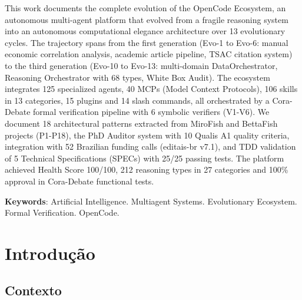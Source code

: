 \documentclass[12pt,a4paper,sumario=tradicional]{abntex2}
\begin{document}
This work documents the complete evolution of the OpenCode Ecosystem, an autonomous multi-agent platform that evolved from a fragile reasoning system into an autonomous computational elegance architecture over 13 evolutionary cycles. The trajectory spans from the first generation (Evo-1 to Evo-6: manual economic correlation analysis, academic article pipeline, TSAC citation system) to the third generation (Evo-10 to Evo-13: multi-domain DataOrchestrator, Reasoning Orchestrator with 68 types, White Box Audit). The ecosystem integrates 125 specialized agents, 40 MCPs (Model Context Protocols), 106 skills in 13 categories, 15 plugins and 14 slash commands, all orchestrated by a Cora-Debate formal verification pipeline with 6 symbolic verifiers (V1-V6). We document 18 architectural patterns extracted from MiroFish and BettaFish projects (P1-P18), the PhD Auditor system with 10 Qualis A1 quality criteria, integration with 52 Brazilian funding calls (editais-br v7.1), and TDD validation of 5 Technical Specifications (SPECs) with 25/25 passing tests. The platform achieved Health Score 100/100, 212 reasoning types in 27 categories and 100\% approval in Cora-Debate functional tests.

\vspace{0.5cm}
\textbf{Keywords}: Artificial Intelligence. Multiagent Systems. Evolutionary Ecosystem. Formal Verification. OpenCode.

\newpage
\listoffigures
\vspace{1cm}
\listoftables

\newpage
\tableofcontents
\newpage

\chapter{Introdução}

\section{Contexto}
\end{document}

